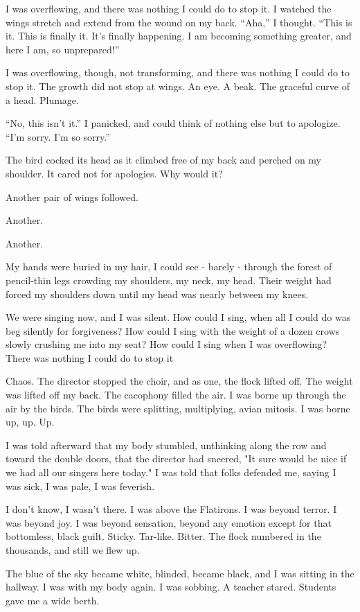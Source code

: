 I was overflowing, and there was nothing I could do to stop it. I watched the wings stretch and extend from the wound on my back. ``Aha,'' I thought. ``This is it. This is finally it. It's finally happening. I am becoming something greater, and here I am, so unprepared!''

I was overflowing, though, not transforming, and there was nothing I could do to stop it. The growth did not stop at wings. An eye. A beak. The graceful curve of a head. Plumage.

``No, this isn't it.'' I panicked, and could think of nothing else but to apologize. ``I'm sorry. I'm so sorry.''

The bird cocked its head as it climbed free of my back and perched on my shoulder. It cared not for apologies. Why would it?

Another pair of wings followed.

Another.

Another.

My hands were buried in my hair, I could see - barely - through the forest of pencil-thin legs crowding my shoulders, my neck, my head. Their weight had forced my shoulders down until my head was nearly between my knees.

We were singing now, and I was silent. How could I sing, when all I could do was beg silently for forgiveness? How could I sing with the weight of a dozen crows slowly crushing me into my seat? How could I sing when I was overflowing? There was nothing I could do to stop it

Chaos. The director stopped the choir, and as one, the flock lifted off. The weight was lifted off my back. The cacophony filled the air. I was borne up through the air by the birds. The birds were splitting, multiplying, avian mitosis. I was borne up, up. Up.

I was told afterward that my body stumbled, unthinking along the row and toward the double doors, that the director had sneered, "It sure would be nice if we had all our singers here today." I was told that folks defended me, saying I was sick, I was pale, I was feverish.

I don't know, I wasn't there. I was above the Flatirons. I was beyond terror. I was beyond joy. I was beyond sensation, beyond any emotion except for that bottomless, black guilt. Sticky. Tar-like. Bitter. The flock numbered in the thousands, and still we flew up.

The blue of the sky became white, blinded, became black, and I was sitting in the hallway. I was with my body again. I was sobbing. A teacher stared. Students gave me a wide berth.

